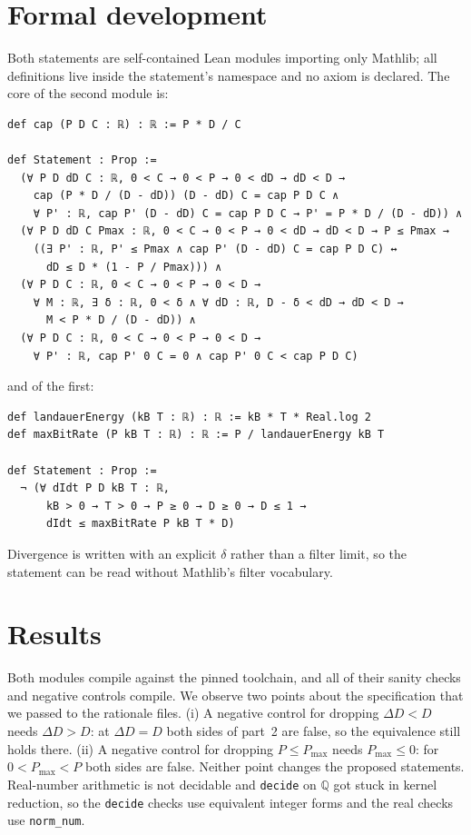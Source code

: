 \documentclass[11pt]{article}
\theoremstyle{remark}
\begin{document}
\section{Formal development}
Both statements are self-contained Lean modules importing only Mathlib; all definitions live
inside the statement's namespace and no axiom is declared. The core of the second module is:
\begin{lstlisting}
def cap (P D C : ℝ) : ℝ := P * D / C

def Statement : Prop :=
  (∀ P D dD C : ℝ, 0 < C → 0 < P → 0 < dD → dD < D →
    cap (P * D / (D - dD)) (D - dD) C = cap P D C ∧
    ∀ P' : ℝ, cap P' (D - dD) C = cap P D C → P' = P * D / (D - dD)) ∧
  (∀ P D dD C Pmax : ℝ, 0 < C → 0 < P → 0 < dD → dD < D → P ≤ Pmax →
    ((∃ P' : ℝ, P' ≤ Pmax ∧ cap P' (D - dD) C = cap P D C) ↔
      dD ≤ D * (1 - P / Pmax))) ∧
  (∀ P D C : ℝ, 0 < C → 0 < P → 0 < D →
    ∀ M : ℝ, ∃ δ : ℝ, 0 < δ ∧ ∀ dD : ℝ, D - δ < dD → dD < D →
      M < P * D / (D - dD)) ∧
  (∀ P D C : ℝ, 0 < C → 0 < P → 0 < D →
    ∀ P' : ℝ, cap P' 0 C = 0 ∧ cap P' 0 C < cap P D C)
\end{lstlisting}
and of the first:
\begin{lstlisting}
def landauerEnergy (kB T : ℝ) : ℝ := kB * T * Real.log 2
def maxBitRate (P kB T : ℝ) : ℝ := P / landauerEnergy kB T

def Statement : Prop :=
  ¬ (∀ dIdt P D kB T : ℝ,
      kB > 0 → T > 0 → P ≥ 0 → D ≥ 0 → D ≤ 1 →
      dIdt ≤ maxBitRate P kB T * D)
\end{lstlisting}
Divergence is written with an explicit $\delta$ rather than a filter limit, so the statement can
be read without Mathlib's filter vocabulary.

\section{Results}
Both modules compile against the pinned toolchain, and all of their sanity checks and negative
controls compile. We observe two points about the specification that we passed to the
rationale files. (i) A negative control for dropping $\Delta D<D$ needs $\Delta D>D$: at
$\Delta D=D$ both sides of part~2 are false, so the equivalence still holds there. (ii) A negative
control for dropping $P\le P_{\max}$ needs $P_{\max}\le0$: for $0<P_{\max}<P$ both sides are
false. Neither point changes the proposed statements. Real-number arithmetic is not decidable
and \texttt{decide} on $\mathbb{Q}$ got stuck in kernel reduction, so the \texttt{decide} checks
use equivalent integer forms and the real checks use \texttt{norm\_num}.
\end{document}
